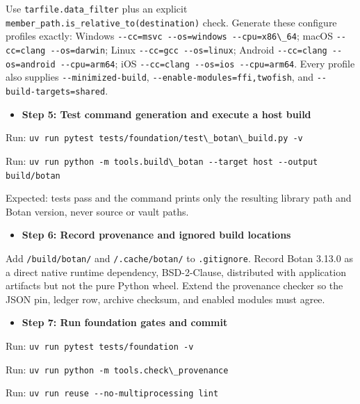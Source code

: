 \documentclass[
  letterpaper,
]{article}
\newcommand{\passthrough}[1]{#1}
\providecommand{\tightlist}{%
  \setlength{\itemsep}{0pt}\setlength{\parskip}{0pt}}
\begin{document}
Use \nolinkurl{tarfile.data_filter} plus an explicit \nolinkurl{member_path.is_relative_to(destination)} check. Generate
these configure profiles exactly: Windows \passthrough{\lstinline!--cc=msvc --os=windows --cpu=x86\_64!}; macOS
\passthrough{\lstinline!--cc=clang --os=darwin!}; Linux \passthrough{\lstinline!--cc=gcc --os=linux!}; Android
\passthrough{\lstinline!--cc=clang --os=android --cpu=arm64!}; iOS
\passthrough{\lstinline!--cc=clang --os=ios --cpu=arm64!}. Every profile also supplies \nolinkurl{--minimized-build},
\nolinkurl{--enable-modules=ffi,twofish}, and \nolinkurl{--build-targets=shared}.

\begin{itemize}
\tightlist
\item[$\square$]
  \textbf{Step 5: Test command generation and execute a host build}
\end{itemize}

Run: \passthrough{\lstinline!uv run pytest tests/foundation/test\_botan\_build.py -v!}

Run: \passthrough{\lstinline!uv run python -m tools.build\_botan --target host --output build/botan!}

Expected: tests pass and the command prints only the resulting library path and Botan version, never source or vault
paths.

\begin{itemize}
\tightlist
\item[$\square$]
  \textbf{Step 6: Record provenance and ignored build locations}
\end{itemize}

Add \nolinkurl{/build/botan/} and \nolinkurl{/.cache/botan/} to \nolinkurl{.gitignore}. Record Botan 3.13.0 as a direct
native runtime dependency, BSD-2-Clause, distributed with application artifacts but not the pure Python wheel. Extend
the provenance checker so the JSON pin, ledger row, archive checksum, and enabled modules must agree.

\begin{itemize}
\tightlist
\item[$\square$]
  \textbf{Step 7: Run foundation gates and commit}
\end{itemize}

Run: \passthrough{\lstinline!uv run pytest tests/foundation -v!}

Run: \passthrough{\lstinline!uv run python -m tools.check\_provenance!}

Run: \passthrough{\lstinline!uv run reuse --no-multiprocessing lint!}
\end{document}
